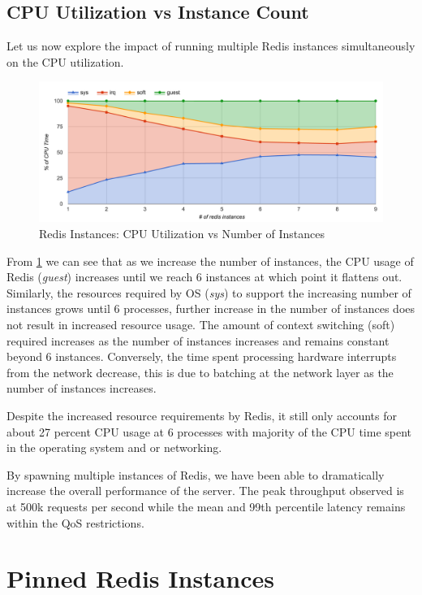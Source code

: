 \subsection{CPU Utilization vs Instance Count}
Let us now explore the impact of running multiple Redis instances simultaneously on the CPU utilization.

\begin{figure}[h]
    \includegraphics[width=\textwidth]{./res/6_instances_cpu.png}
    \caption{Redis Instances: CPU Utilization vs Number of Instances}
    \label{fig:6_instances_cpu.png}
\end{figure}

From \ref{fig:6_instances_cpu.png} we can see that as we increase the number of instances, the CPU usage of Redis (\textit{guest}) increases until we reach 6 instances at which point it flattens out. Similarly, the resources required by OS (\textit{sys}) to support the increasing number of instances grows until 6 processes, further increase in the number of instances does not result in increased resource usage. The amount of context switching (soft) required increases as the number of instances increases and remains constant beyond 6 instances. Conversely, the time spent processing hardware interrupts from the network decrease, this is due to batching at the network layer as the number of instances increases.

Despite the increased resource requirements by Redis, it still only accounts for about 27 percent CPU usage at 6 processes with majority of the CPU time spent in the operating system and or networking.


By spawning multiple instances of Redis, we have been able to dramatically increase the overall performance of the server. The peak throughput observed is at 500k requests per second while the mean and 99th percentile latency remains within the QoS restrictions.


\section{Pinned Redis Instances}

